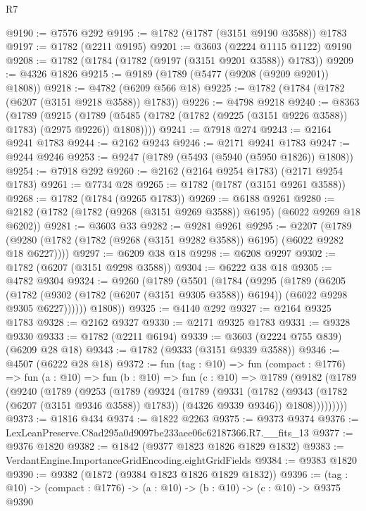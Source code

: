 \begin{lexlean}{R7}
\begin{coremodule}
@9190 := @7576 @292
@9195 := @1782 (@1787 (@3151 @9190 @3588)) @1783
@9197 := @1782 (@2211 @9195)
@9201 := @3603 (@2224 @1115 @1122) @9190
@9208 := @1782 (@1784 (@1782 (@9197 (@3151 @9201 @3588)) @1783))
@9209 := @4326 @1826
@9215 := @9189 (@1789 (@5477 (@9208 (@9209 @9201)) @1808))
@9218 := @4782 (@6209 @566 @18)
@9225 := @1782 (@1784 (@1782 (@6207 (@3151 @9218 @3588)) @1783))
@9226 := @4798 @9218
@9240 := @8363
    (@1789
      (@9215 (@1789 (@5485 (@1782 (@1782 (@9225 (@3151 @9226 @3588)) @1783) (@2975 @9226)) @1808))))
@9241 := @7918 @274
@9243 := @2164 @9241 @1783
@9244 := @2162 @9243
@9246 := @2171 @9241 @1783
@9247 := @9244 @9246
@9253 := @9247 (@1789 (@5493 (@5940 (@5950 @1826)) @1808))
@9254 := @7918 @292
@9260 := @2162 (@2164 @9254 @1783) (@2171 @9254 @1783)
@9261 := @7734 @28
@9265 := @1782 (@1787 (@3151 @9261 @3588))
@9268 := @1782 (@1784 (@9265 @1783))
@9269 := @6188 @9261
@9280 := @2182 (@1782 (@1782 (@9268 (@3151 @9269 @3588)) @6195) (@6022 @9269 @18 @6202))
@9281 := @3603 @33
@9282 := @9281 @9261
@9295 := @2207
    (@1789 (@9280 (@1782 (@1782 (@9268 (@3151 @9282 @3588)) @6195) (@6022 @9282 @18 @6227))))
@9297 := @6209 @38 @18
@9298 := @6208 @9297
@9302 := @1782 (@6207 (@3151 @9298 @3588))
@9304 := @6222 @38 @18
@9305 := @4782 @9304
@9324 := @9260
    (@1789
      (@5501
        (@1784
          (@9295
            (@1789
              (@6205
                (@1782
                  (@9302 (@1782 (@6207 (@3151 @9305 @3588)) @6194))
                  (@6022 @9298 @9305 @6227))))))
        @1808))
@9325 := @4140 @292
@9327 := @2164 @9325 @1783
@9328 := @2162 @9327
@9330 := @2171 @9325 @1783
@9331 := @9328 @9330
@9333 := @1782 (@2211 @6194)
@9339 := @3603 (@2224 @755 @839) (@6209 @28 @18)
@9343 := @1782 (@9333 (@3151 @9339 @3588))
@9346 := @4507 (@6222 @28 @18)
@9372 := fun (tag : @10) =>
  fun (compact : @1776) =>
  fun (a : @10) =>
  fun (b : @10) =>
  fun (c : @10) =>
  @1789
    (@9182
      (@1789
        (@9240
          (@1789
            (@9253
              (@1789
                (@9324
                  (@1789
                    (@9331
                      (@1782 (@9343 (@1782 (@6207 (@3151 @9346 @3588)) @1783)) (@4326 @9339 @9346))
                      @1808)))))))))
@9373 := @1816 @434
@9374 := @1822 @2263
@9375 := @9373 @9374
@9376 := LexLeanPreserve.C8ad295a0d9097be233aee06c62187366.R7.__fits_13
@9377 := @9376 @1820
@9382 := @1842 (@9377 @1823 @1826 @1829 @1832)
@9383 := VerdantEngine.ImportanceGridEncoding.eightGridFields
@9384 := @9383 @1820
@9390 := @9382 (@1872 (@9384 @1823 @1826 @1829 @1832))
@9396 := (tag : @10) -> (compact : @1776) -> (a : @10) -> (b : @10) -> (c : @10) -> @9375 @9390

\end{coremodule}
\end{lexlean}
